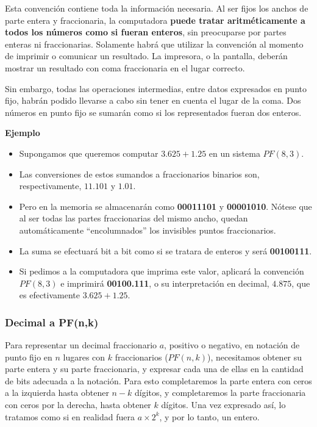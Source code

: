 \documentclass[spanish,a4paper,]{article}
\providecommand{\tightlist}{%
  \setlength{\itemsep}{0pt}\setlength{\parskip}{0pt}}
\begin{document}
Esta convención contiene toda la información necesaria. Al ser fijos los
anchos de parte entera y fraccionaria, la computadora \textbf{puede
tratar aritméticamente a todos los números como si fueran enteros}, sin
preocuparse por partes enteras ni fraccionarias. Solamente habrá que
utilizar la convención al momento de imprimir o comunicar un resultado.
La impresora, o la pantalla, deberán mostrar un resultado con coma
fraccionaria en el lugar correcto.

Sin embargo, todas las operaciones intermedias, entre datos expresados
en punto fijo, habrán podido llevarse a cabo sin tener en cuenta el
lugar de la coma. Dos números en punto fijo se sumarán como si los
representados fueran dos enteros.

\textbf{Ejemplo}

\begin{itemize}
\tightlist
\item
  Supongamos que queremos computar \(3.625 + 1.25\) en un sistema
  \(PF(8,3)\).
\item
  Las conversiones de estos sumandos a fraccionarios binarios son,
  respectivamente, \(11.101\) y \(1.01\).
\item
  Pero en la memoria se almacenarán como \textbf{00011101} y
  \textbf{00001010}. Nótese que al ser todas las partes fraccionarias
  del mismo ancho, quedan automáticamente ``encolumnados'' los
  invisibles puntos fraccionarios.
\item
  La suma se efectuará bit a bit como si se tratara de enteros y será
  \textbf{00100111}.
\item
  Si pedimos a la computadora que imprima este valor, aplicará la
  convención \(PF(8,3)\) e imprimirá \textbf{00100.111}, o su
  interpretación en decimal, \(4.875\), que es efectivamente
  \(3.625 + 1.25\).
\end{itemize}

\hypertarget{decimal-a-pfnk}{%
\subsubsection{Decimal a PF(n,k)}\label{decimal-a-pfnk}}

Para representar un decimal fraccionario \(a\), positivo o negativo, en
notación de punto fijo en \(n\) lugares con \(k\) fraccionarios
(\(PF(n,k)\)), necesitamos obtener su parte entera y su parte
fraccionaria, y expresar cada una de ellas en la cantidad de bits
adecuada a la notación. Para esto completaremos la parte entera con
ceros a la izquierda hasta obtener \(n-k\) dígitos, y completaremos la
parte fraccionaria con ceros por la derecha, hasta obtener \(k\)
dígitos. Una vez expresado así, lo tratamos como si en realidad fuera
\(a \times 2^k\), y por lo tanto, un entero.
\end{document}
